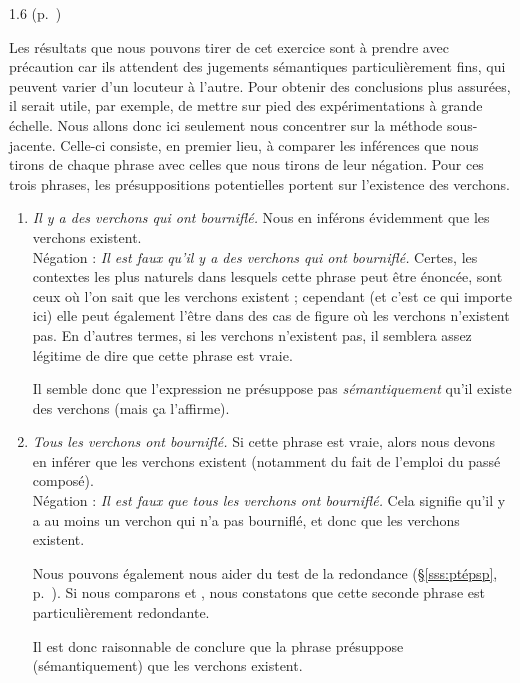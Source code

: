 \begin{Solution}{1.{6}}
(p.~\pageref{exo:1psp2})

Les résultats que nous pouvons tirer de cet exercice sont à prendre avec précaution car ils attendent des jugements sémantiques particulièrement fins, qui peuvent varier d'un locuteur à l'autre. Pour obtenir des conclusions plus assurées, il serait utile, par exemple, de mettre sur pied des expérimentations à grande échelle.  Nous allons donc ici seulement nous concentrer sur la méthode sous-jacente.  Celle-ci consiste, en premier lieu, à comparer les inférences que nous tirons de chaque phrase avec celles que nous tirons de leur négation.  Pour ces trois phrases, les présuppositions potentielles portent sur l'existence des verchons.
\begin{enumerate}
\item \emph{Il y a des verchons qui ont bourniflé.}
Nous en inférons évidemment que les verchons existent.\\
Négation : \emph{Il est faux qu'il y a des verchons qui ont bourniflé.}
Certes, les contextes les plus naturels dans lesquels cette phrase peut être énoncée, sont ceux où l'on sait que les verchons existent ; cependant (et c'est ce qui importe ici) elle peut également l'être dans des cas de figure où les verchons n'existent pas.  En d'autres termes, si les verchons n'existent pas, il semblera assez légitime de dire que cette phrase est vraie.

Il semble donc que l'expression  ne présuppose pas \emph{sémantiquement} qu'il existe des verchons (mais ça l'affirme).

\item \emph{Tous les verchons ont bourniflé.}  Si cette phrase est vraie, alors nous devons en inférer que les verchons existent (notamment du fait de l'emploi du passé composé).\\
Négation : \emph{Il est faux que tous les verchons ont bourniflé.} Cela signifie qu'il y a au moins un verchon qui n'a pas bourniflé, et donc que les verchons existent.

Nous pouvons également nous aider du test de la redondance (\S\ref{sss:ptépsp}, p.~\pageref{p.testAB}).  Si nous comparons  et , nous constatons que cette seconde phrase est particulièrement redondante.

Il est donc raisonnable de conclure que la phrase présuppose (sémantiquement) que les verchons existent.


\end{enumerate}
\end{Solution}
